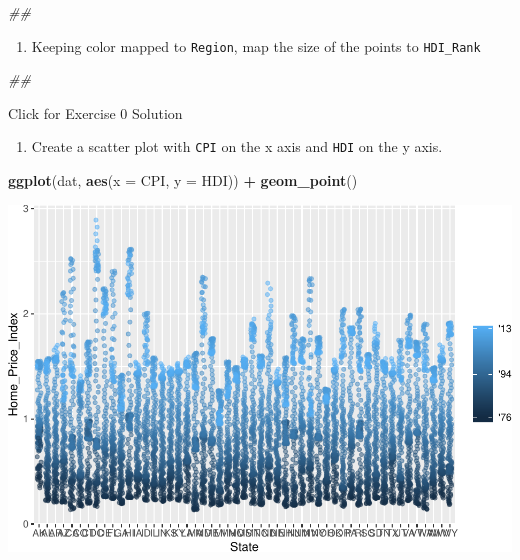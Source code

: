 \documentclass[
]{book}
\newenvironment{Shaded}{\begin{snugshade}}{\end{snugshade}}
\newcommand{\CommentTok}[1]{\textcolor[rgb]{0.56,0.35,0.01}{\textit{#1}}}
\newcommand{\DataTypeTok}[1]{\textcolor[rgb]{0.13,0.29,0.53}{#1}}
\newcommand{\KeywordTok}[1]{\textcolor[rgb]{0.13,0.29,0.53}{\textbf{#1}}}
\newcommand{\NormalTok}[1]{#1}
\newcommand{\OperatorTok}[1]{\textcolor[rgb]{0.81,0.36,0.00}{\textbf{#1}}}
\newcommand{\StringTok}[1]{\textcolor[rgb]{0.31,0.60,0.02}{#1}}
\providecommand{\tightlist}{%
  \setlength{\itemsep}{0pt}\setlength{\parskip}{0pt}}
\begin{document}
\begin{Shaded}
\begin{Highlighting}[]
\CommentTok{\#\# }
\end{Highlighting}
\end{Shaded}

\begin{enumerate}
\def\labelenumi{\arabic{enumi}.}
\setcounter{enumi}{4}
\tightlist
\item
  Keeping color mapped to \texttt{Region}, map the size of the points to \texttt{HDI\_Rank}
\end{enumerate}

\begin{Shaded}
\begin{Highlighting}[]
\CommentTok{\#\# }
\end{Highlighting}
\end{Shaded}

{Click for Exercise 0 Solution}

\begin{enumerate}
\def\labelenumi{\arabic{enumi}.}
\tightlist
\item
  Create a scatter plot with \texttt{CPI} on the x axis and \texttt{HDI} on the y axis.
\end{enumerate}

\begin{Shaded}
\begin{Highlighting}[]
\KeywordTok{ggplot}\NormalTok{(dat, }\KeywordTok{aes}\NormalTok{(}\DataTypeTok{x =}\NormalTok{ CPI, }\DataTypeTok{y =}\NormalTok{ HDI)) }\OperatorTok{+}
\StringTok{  }\KeywordTok{geom\_point}\NormalTok{()}
\end{Highlighting}
\end{Shaded}

\includegraphics{R/Rgraphics/figures/unnamed-chunk-174-1.pdf}
\end{document}
